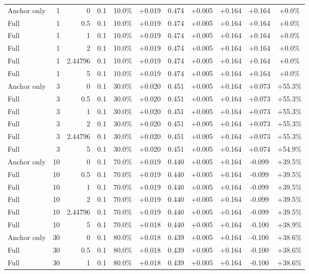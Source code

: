 \begin{table}[htbp]
\begin{tabular}{lrrrccccccc}
Anchor only & 1 & 0 & 0.1 & 10.0\% & +0.019 & 0.474 & +0.005 & +0.164 & +0.164 & +0.0\% \\
Full & 1 & 0.5 & 0.1 & 10.0\% & +0.019 & 0.474 & +0.005 & +0.164 & +0.164 & +0.0\% \\
Full & 1 & 1 & 0.1 & 10.0\% & +0.019 & 0.474 & +0.005 & +0.164 & +0.164 & +0.0\% \\
Full & 1 & 2 & 0.1 & 10.0\% & +0.019 & 0.474 & +0.005 & +0.164 & +0.164 & +0.0\% \\
Full & 1 & 2.44796 & 0.1 & 10.0\% & +0.019 & 0.474 & +0.005 & +0.164 & +0.164 & +0.0\% \\
Full & 1 & 5 & 0.1 & 10.0\% & +0.019 & 0.474 & +0.005 & +0.164 & +0.164 & +0.0\% \\
Anchor only & 3 & 0 & 0.1 & 30.0\% & +0.020 & 0.451 & +0.005 & +0.164 & +0.073 & +55.3\% \\
Full & 3 & 0.5 & 0.1 & 30.0\% & +0.020 & 0.451 & +0.005 & +0.164 & +0.073 & +55.3\% \\
Full & 3 & 1 & 0.1 & 30.0\% & +0.020 & 0.451 & +0.005 & +0.164 & +0.073 & +55.3\% \\
Full & 3 & 2 & 0.1 & 30.0\% & +0.020 & 0.451 & +0.005 & +0.164 & +0.073 & +55.3\% \\
Full & 3 & 2.44796 & 0.1 & 30.0\% & +0.020 & 0.451 & +0.005 & +0.164 & +0.073 & +55.3\% \\
Full & 3 & 5 & 0.1 & 30.0\% & +0.020 & 0.451 & +0.005 & +0.164 & +0.074 & +54.9\% \\
Anchor only & 10 & 0 & 0.1 & 70.0\% & +0.019 & 0.440 & +0.005 & +0.164 & -0.099 & +39.5\% \\
Full & 10 & 0.5 & 0.1 & 70.0\% & +0.019 & 0.440 & +0.005 & +0.164 & -0.099 & +39.5\% \\
Full & 10 & 1 & 0.1 & 70.0\% & +0.019 & 0.440 & +0.005 & +0.164 & -0.099 & +39.5\% \\
Full & 10 & 2 & 0.1 & 70.0\% & +0.019 & 0.440 & +0.005 & +0.164 & -0.099 & +39.5\% \\
Full & 10 & 2.44796 & 0.1 & 70.0\% & +0.019 & 0.440 & +0.005 & +0.164 & -0.099 & +39.5\% \\
Full & 10 & 5 & 0.1 & 70.0\% & +0.018 & 0.440 & +0.005 & +0.164 & -0.100 & +38.9\% \\
Anchor only & 30 & 0 & 0.1 & 80.0\% & +0.018 & 0.439 & +0.005 & +0.164 & -0.100 & +38.6\% \\
Full & 30 & 0.5 & 0.1 & 80.0\% & +0.018 & 0.439 & +0.005 & +0.164 & -0.100 & +38.6\% \\
Full & 30 & 1 & 0.1 & 80.0\% & +0.018 & 0.439 & +0.005 & +0.164 & -0.100 & +38.6\% \\

\end{tabular}
\end{table}
